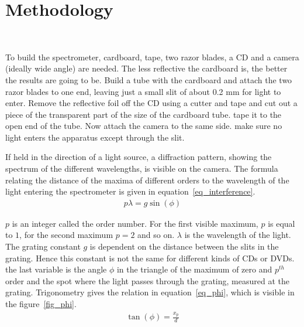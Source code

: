 \section{Methodology}~\label{sec_methodology}

    To build the spectrometer, cardboard, tape, two razor blades, a CD and a camera (ideally wide angle) are needed.
    The less reflective the cardboard is, the better the results are going to be.
    Build a tube with the cardboard and attach the two razor blades to one end, leaving just a small slit of about 0.2 mm for light to enter.
    Remove the reflective foil off the CD using a cutter and tape and cut out a piece of the transparent part of the size of the cardboard tube.
    tape it to the open end of the tube.
    Now attach the camera to the same side.
    make sure no light enters the apparatus except through the slit.

    If held in the direction of a light source, a diffraction pattern, showing the spectrum of the different wavelengths, is visible on the camera.
    The formula relating the distance of the maxima of different orders to the wavelength of the light entering the spectrometer is given in equation~\eqref{eq_interference}.
    \begin{align}
        p \lambda = g \sin(\phi) \label{eq_interference}
    \end{align}

    $p$ is an integer called the order number. For the first visible maximum, $p$ is equal to $1$, for the second maximum $p = 2$ and so on.
    $\lambda$ is the wavelength of the light.
    The grating constant $g$ is dependent on the distance between the slits in the grating.
    Hence this constant is not the same for different kinds of CDs or DVDs.
    the last variable is the angle $\phi$ in the triangle of the maximum of zero and $p^{th}$ order and the spot where the light passes through the grating, measured at the grating.
    Trigonometry gives the relation in equation~\eqref{eq_phi}, which is visible in the figure~\ref{fig_phi}.
    \begin{align}
        \tan(\phi) = \frac{x_p}{d} \label{eq_phi}
    \end{align}

